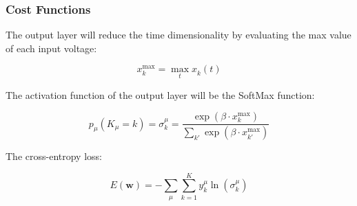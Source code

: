 \subsubsection{Cost Functions}

The output layer will reduce the time dimensionality by evaluating the max value of each input voltage:

\begin{equation}
    x_k^\text{max} = \max_t x_k^{}(t)
\end{equation}

The activation function of the output layer will be the SoftMax function:

\begin{equation}
    p_\mu(K_\mu=k) = \sigma_k^\mu = \frac{\exp(\beta \cdot x_k^\text{max})}{\sum_{k'} \exp(\beta \cdot x_{k'}^\text{max})}
\end{equation}

The cross-entropy loss:

\begin{equation}
    E(\mathbf{w}) = -\sum_\mu \sum_{k=1}^K y_k^\mu \ln(\sigma_k^\mu)
\end{equation}
